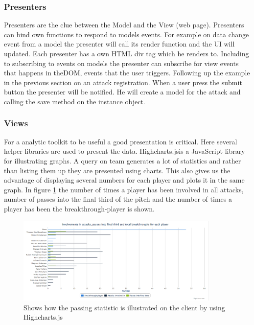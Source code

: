 \subsubsection{Presenters}

Presenters are the clue between the Model and the View (web page). Presenters can bind own functions to respond to models events. For example on data change event from a model the presenter will call its render function and the \ac{UI} will updated. Each presenter has a own \ac{HTML} div tag which he renders to. Including to subscribing to events on models the presenter can subscribe for view events that happens in the\ac{DOM}, events that the user triggers. Following up the example in the previous section on an attack registration. When a user press the submit button the presenter will be notified. He will create a model for the attack and calling the save method on the instance object.

\subsubsection{Views}

For a analytic toolkit to be useful a good presentation is critical. Here several helper libraries are used to present the data. Highcharts.js\footnotemark is a JavaScript library for illustrating graphs. A query on team generates a lot of statistics and rather than listing them up they are presented using charts. This also gives us the advantage of displaying several numbers for each player and plots it in the same graph. In figure \ref{fig:chart} the number of times a player has been involved in all attacks, number of passes into the final third of the pitch and the number of times a player has been the breakthrough-player is shown.


\begin{figure}[ht!]
\centering
\includegraphics[width=100mm]{images/general/chart_passes.png}
\caption{Shows how the passing statistic is illustrated on the client by using Highcharts.js}
\label{fig:chart}
\end{figure}

